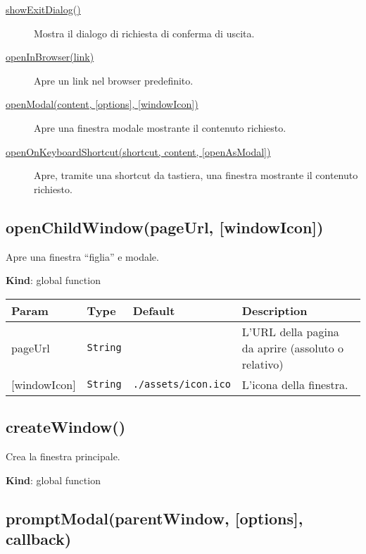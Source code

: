 \begin{description}
\item[{ \protect\hyperlink{showExitDialog}{showExitDialog()} }]
Mostra il dialogo di richiesta di conferma di uscita.
\item[{ \protect\hyperlink{openInBrowser}{openInBrowser(link)} }]
Apre un link nel browser predefinito.
\item[{ \protect\hyperlink{openModal}{openModal(content, {[}options{]},
{[}windowIcon{]})} }]
Apre una finestra modale mostrante il contenuto richiesto.
\item[{
\protect\hyperlink{openOnKeyboardShortcut}{openOnKeyboardShortcut(shortcut,
content, {[}openAsModal{]})} }]
Apre, tramite una shortcut da tastiera, una finestra mostrante il
contenuto richiesto.
\end{description}

\protect\hypertarget{openChildWindow}{}{}

\hypertarget{openchildwindowpageurl-windowicon}{%
\subsection{openChildWindow(pageUrl,
{[}windowIcon{]})}\label{openchildwindowpageurl-windowicon}}

Apre una finestra ``figlia'' e modale.

\textbf{Kind}: global function

\begin{longtabu} to \textwidth {X[1,L,m]X[1,L,m]X[1.5,L,m]X[1.5,L,m]}
\toprule
Param & Type & Default & Description\tabularnewline
\midrule
\endhead
pageUrl & \texttt{String} & & L'URL della pagina da aprire (assoluto o
relativo)\tabularnewline
{[}windowIcon{]} & \texttt{String} & \texttt{./assets/icon.ico} &
L'icona della finestra.\tabularnewline
\bottomrule
\end{longtabu}

\protect\hypertarget{createWindow}{}{}

\hypertarget{createwindow}{%
\subsection{createWindow()}\label{createwindow}}

Crea la finestra principale.

\textbf{Kind}: global function\\
\protect\hypertarget{promptModal}{}{}

\hypertarget{promptmodalparentwindow-options-callback}{%
\subsection{promptModal(parentWindow, {[}options{]},
callback)}\label{promptmodalparentwindow-options-callback}}

